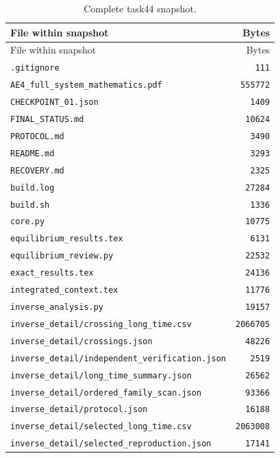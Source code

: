 \begingroup\scriptsize
\setlength{\tabcolsep}{3pt}
\begin{longtable}{p{.78\linewidth}r}
\caption{Complete task44 snapshot.}\\
\toprule
File within snapshot & Bytes \\
\midrule\endfirsthead
\toprule
File within snapshot & Bytes \\
\midrule\endhead
\bottomrule\endfoot
\nolinkurl{.gitignore} & \texttt{111} \\
\nolinkurl{AE4_full_system_mathematics.pdf} & \texttt{555772} \\
\nolinkurl{CHECKPOINT_01.json} & \texttt{1409} \\
\nolinkurl{FINAL_STATUS.md} & \texttt{10624} \\
\nolinkurl{PROTOCOL.md} & \texttt{3490} \\
\nolinkurl{README.md} & \texttt{3293} \\
\nolinkurl{RECOVERY.md} & \texttt{2325} \\
\nolinkurl{build.log} & \texttt{27284} \\
\nolinkurl{build.sh} & \texttt{1336} \\
\nolinkurl{core.py} & \texttt{10775} \\
\nolinkurl{equilibrium_results.tex} & \texttt{6131} \\
\nolinkurl{equilibrium_review.py} & \texttt{22532} \\
\nolinkurl{exact_results.tex} & \texttt{24136} \\
\nolinkurl{integrated_context.tex} & \texttt{11776} \\
\nolinkurl{inverse_analysis.py} & \texttt{19157} \\
\nolinkurl{inverse_detail/crossing_long_time.csv} & \texttt{2066705} \\
\nolinkurl{inverse_detail/crossings.json} & \texttt{48226} \\
\nolinkurl{inverse_detail/independent_verification.json} & \texttt{2519} \\
\nolinkurl{inverse_detail/long_time_summary.json} & \texttt{26562} \\
\nolinkurl{inverse_detail/ordered_family_scan.json} & \texttt{93366} \\
\nolinkurl{inverse_detail/protocol.json} & \texttt{16188} \\
\nolinkurl{inverse_detail/selected_long_time.csv} & \texttt{2063008} \\
\nolinkurl{inverse_detail/selected_reproduction.json} & \texttt{17141} \\

\end{longtable}
